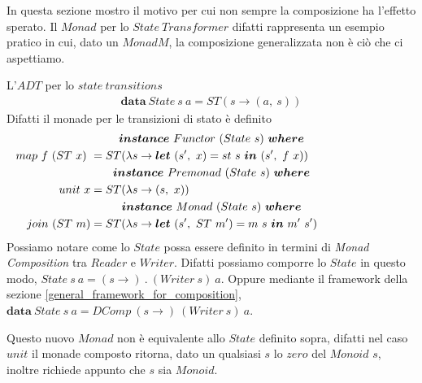\label{state_transformer}

In questa sezione mostro il motivo per cui non sempre la composizione ha
l'effetto sperato.
Il $Monad$ per lo $State\ Transformer$ difatti rappresenta un esempio pratico
in cui, dato un $Monad M$, la composizione generalizzata non è ciò che ci
aspettiamo.\newline

L'$ADT$ per lo $state\ transitions$
\begin{align*}
  \bm{data}\ State\ s\ a = ST(s \to (a,\ s))
\end{align*}
Difatti il monade per le transizioni di stato è definito
\begin{align*}
  \classdef{\bm{instance}\ Functor\ (State\ s)\ \bm{where}}
  map\ f\ (ST\ x)\ &= ST(\lambda s \to \bm{let}\ (s',\ x) = st\ s\ \bm{in}\ (s',\ f\ x))\\
  \classdef{\bm{instance}\ Premonad\ (State\ s)\ \bm{where}}
  unit\ x &= ST(\lambda s \to (s,\ x))\\
  \classdef{\bm{instance}\ Monad\ (State\ s)\ \bm{where}}
  join\ (ST\ m) &= ST(\lambda s \to \bm{let}\ (s',\ ST\ m') = m\ s\ \bm{in}\ m'\ s')\\
\end{align*}
Possiamo notare come lo $State$ possa essere definito in termini di
\textit{Monad Composition} tra $Reader$ e $Writer$.
Difatti possiamo comporre lo $State$ in questo modo, $State\ s\ a = (s \to)\ .\ (Writer\ s)\ a$.
Oppure mediante il framework della sezione \ref{general_framework_for_composition},
$\bm{data}\ State\ s\ a = DComp\ (s \to)\ (Writer\ s)\ a$.\newline

Questo nuovo $Monad$ non è equivalente allo $State$ definito sopra, difatti nel caso
$unit$ il monade composto ritorna, dato un qualsiasi $s$ lo $zero$ del $Monoid$
$s$, inoltre richiede appunto che $s$ sia $Monoid$.\newline

